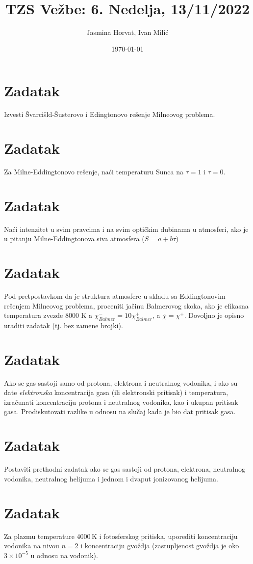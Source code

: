 \documentclass[12pt]{article}
\title{TZS Ve\v{z}be: 6. Nedelja, 13/11/2022}
\author{Jasmina Horvat, Ivan Mili\'{c}}
\date{\today}
\begin{document}
\maketitle

\section{Zadatak}
Izvesti Švarcišld-Šusterovo i Edingtonovo rešenje Milneovog problema. 

\section{Zadatak}
Za Milne-Eddingtonovo rešenje, naći temperaturu Sunca na $\tau=1$ i $\tau=0$. 

\section{Zadatak}
Na\'{c}i intenzitet u svim pravcima i na svim optičkim dubinama u atmosferi, ako je u pitanju Milne-Eddingtonova siva atmosfera ($S=a+b\tau$)

\section{Zadatak}
Pod pretpostavkom da je struktura atmosfere u skladu sa Eddingtonovim re\v{s}enjem Milneovog problema, proceniti ja\v{c}inu Balmerovog skoka, ako je efikasna temperatura zvezde 8000 K a $\chi^-_{Balmer} = 10 \chi^+_{Balmer}$, a $\overline{\chi} = \chi^+$. Dovoljno je opisno uraditi zadatak (tj. bez zamene brojki).

\section{Zadatak}
Ako se gas sastoji samo od protona, elektrona i neutralnog vodonika, i ako su date \emph{elektronska} koncentracija gasa (ili elektronski pritisak) i temperatura, izra\v{c}unati koncentraciju protona i neutralnog vodonika, kao i ukupan pritisak gasa. Prodiskutovati razlike u odnosu na slu\v{c}aj kada je bio dat pritisak gasa. 

\section{Zadatak}
Postaviti prethodni zadatak ako se gas sastoji od protona, elektrona, neutralnog vodonika, neutralnog helijuma i jednom i dvaput jonizovanog helijuma. 

\section{Zadatak}
Za plazmu temperature 4000\,K i fotosferskog pritiska, uporediti koncentraciju vodonika na nivou $n=2$ i koncentraciju gvo\v{z}dja (zastupljenost gvo\v{z}dja je oko $3\times 10^{-5}$ u odnosu na vodonik).
\end{document}
